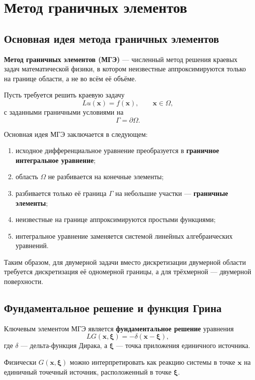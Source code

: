\section{Метод граничных элементов}
\label{sec:boundary-element-method}

\subsection{Основная идея метода граничных элементов}

\textbf{Метод граничных элементов (МГЭ)} --- численный метод решения краевых задач математической физики, в котором неизвестные аппроксимируются только на границе области, а не во всём её объёме.

Пусть требуется решить краевую задачу
$$
L u(\mathbf{x}) = f(\mathbf{x}), \qquad \mathbf{x}\in\Omega,
$$
с заданными граничными условиями на
$$
\Gamma = \partial\Omega.
$$

Основная идея МГЭ заключается в следующем:
\begin{enumerate}
	\item исходное дифференциальное уравнение преобразуется в \textbf{граничное интегральное уравнение};
	\item область $\Omega$ не разбивается на конечные элементы;
	\item разбивается только её граница $\Gamma$ на небольшие участки --- \textbf{граничные элементы};
	\item неизвестные на границе аппроксимируются простыми функциями;
	\item интегральное уравнение заменяется системой линейных алгебраических уравнений.
\end{enumerate}

Таким образом, для двумерной задачи вместо дискретизации двумерной области требуется дискретизация её одномерной границы, а для трёхмерной --- двумерной поверхности.

\subsection{Фундаментальное решение и функция Грина}

Ключевым элементом МГЭ является \textbf{фундаментальное решение} уравнения
$$
L G(\mathbf{x},\boldsymbol{\xi}) = -\delta(\mathbf{x}-\boldsymbol{\xi}),
$$
где $\delta$ --- дельта-функция Дирака, а $\boldsymbol{\xi}$ --- точка приложения единичного источника.

Физически $G(\mathbf{x},\boldsymbol{\xi})$ можно интерпретировать как реакцию системы в точке $\mathbf{x}$ на единичный точечный источник, расположенный в точке $\boldsymbol{\xi}$.

